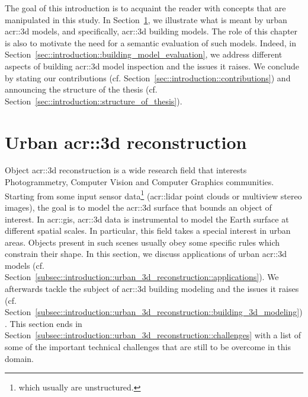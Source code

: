 \minitoc

\vfill

The goal of this introduction is to acquaint the reader with concepts that are manipulated in this study.
In Section~\ref{sec::introduction::urban_3d_reconstruction}, we illustrate what is meant by urban \gls{acr::3d} models, and specifically,  \gls{acr::3d} building models.
The role of this chapter is also to motivate the need for a semantic evaluation of such models.
Indeed, in Section~\ref{sec::introduction::building_model_evaluation}, we address different aspects of building \gls{acr::3d} model inspection and the issues it raises.
We conclude by stating our contributions (cf. Section~\ref{sec::introduction::contributions}) and announcing the structure of the thesis (cf. Section~\ref{sec::introduction::structure_of_thesis}).

\clearpage

\section{Urban \texorpdfstring{\acrshort*{acr::3d}}{3D} reconstruction}
    \label{sec::introduction::urban_3d_reconstruction}
    Object \gls{acr::3d} reconstruction is a wide research field that interests Photogrammetry, Computer Vision and Computer Graphics communities.
    Starting from some input sensor data\footnote{which usually are unstructured.} (\gls{acr::lidar} point clouds or multiview stereo images), the goal is to model the \gls{acr::3d} surface that bounds an object of interest.
    In \acrfull{acr::gis}, \gls{acr::3d} data is instrumental to model the Earth surface at different spatial scales.
    In particular, this field takes a special interest in urban areas.
    Objects present in such scenes usually obey some specific rules which constrain their shape.
    In this section, we discuss applications of urban \gls{acr::3d} models (cf. Section~\ref{subsec::introduction::urban_3d_reconstruction::applications}).
    We afterwards tackle the subject of  \gls{acr::3d} building modeling and the issues it raises (cf. Section~\ref{subsec::introduction::urban_3d_reconstruction::building_3d_modeling}).
    This section ends in Section~\ref{subsec::introduction::urban_3d_reconstruction::challenges} with a list of some of the important technical challenges that are still to be overcome in this domain.

